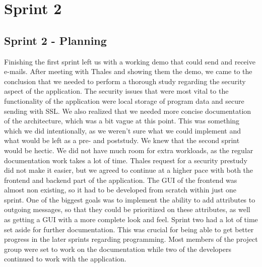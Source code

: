\chapter{Sprint 2}

\section{Sprint 2 - Planning}
Finishing the first sprint left us with a working demo that could send and receive e-mails. After meeting with Thales and showing them the demo, we came to the conclusion that we needed to perform a thorough study regarding the security aspect of the application. The security issues that were most vital to the functionality of the application were local storage of program data and secure sending with SSL. We also realized that we needed more concise documentation of the architecture, which was a bit vague at this point. This was something which we did intentionally, as we weren’t sure what we could implement and what would be left as a pre- and poststudy. 
\newline
\newline
We knew that the second sprint would be hectic. We did not have much room for extra workloads, as the regular documentation work takes a lot of time. Thales request for a security prestudy did not make it easier, but we agreed to continue at a higher pace with both the frontend and backend part of the application. The GUI of the frontend was almost non existing, so it had to be developed from scratch within just one sprint. One of the biggest goals was to implement the ability to add attributes to outgoing messages, so that they could be prioritized on these attributes, as well as getting a GUI with a more complete look and feel.
\newline
\newline
Sprint two had a lot of time set aside for further documentation. This was crucial for being able to get better progress in the later sprints regarding programming. Most members of the project group were set to work on the documentation while two of the developers continued to work with the application. 
